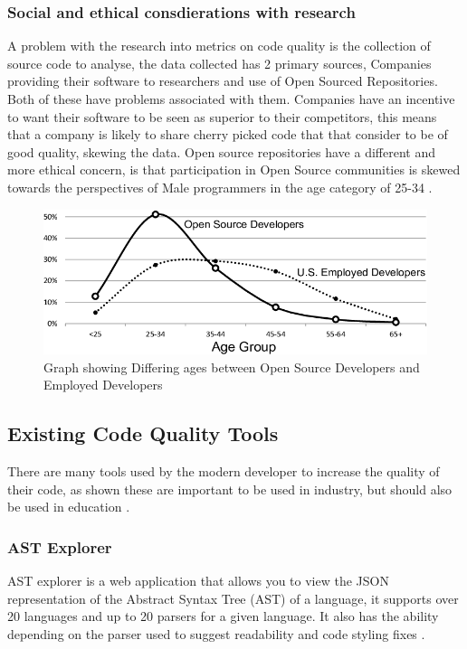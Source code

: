 \subsubsection{\textbf{Social and ethical consdierations with research}}
A 
\newline problem with the research into metrics on code quality is the collection of source code to analyse, the data collected has 2 primary sources, 
Companies providing their software to researchers and use of Open Sourced Repositories. Both of these have problems associated with them. 
Companies have an incentive to want their software to be seen as superior to their competitors, this means that a company is likely to share cherry picked code 
that that consider to be of good quality, skewing the data. Open source repositories have a different and more 
ethical concern, is that participation in Open Source communities is skewed towards the perspectives of Male programmers in the age category of 
25-34 \cite{openSourcePerspective} \cite{womenInOpenSource}.
\begin{figure}[h]
    \includegraphics[width=.4\textwidth]{images/Age-distribution-for-open-source-and-general-developers.png}
    \caption{Graph showing Differing ages between \newline Open Source Developers and Employed Developers \cite{openSourcePerspective}}
    \label{fig:ageOpenSource}
\end{figure}

\subsection{Existing Code Quality Tools}
There are many tools used by the modern developer to increase the quality of their code, as shown these are important to be used in industry, but should 
also be used in education \cite{codeQualityEducation} \cite{codeQualityStudents}.
\subsubsection{\textbf{AST Explorer}}
AST explorer is a web application that allows you to view the JSON representation of the Abstract Syntax Tree (AST) of a language, it supports over 20 languages and 
up to 20 parsers for a given language. It also has the ability depending on the parser used to suggest readability and code styling fixes \cite{astexplorer}.
